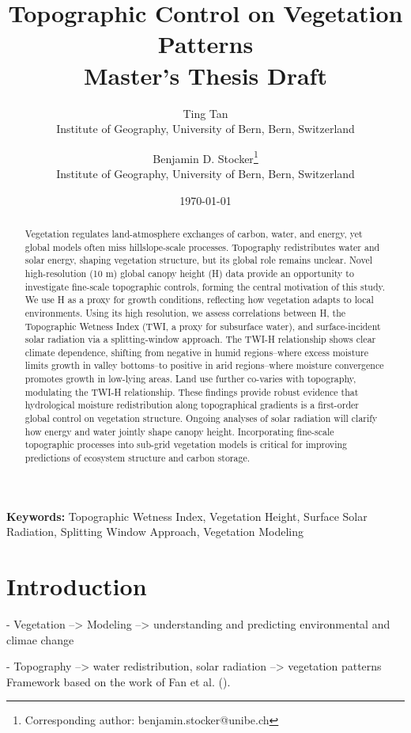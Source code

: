 \documentclass[12pt, a4paper]{article}
\title{Topographic Control on Vegetation Patterns \\ \Large Master's Thesis Draft}
\author{
    Ting Tan \\
    Institute of Geography, University of Bern, Bern, Switzerland
    \and
    Benjamin D. Stocker\thanks{Corresponding author: benjamin.stocker@unibe.ch} \\
    Institute of Geography, University of Bern, Bern, Switzerland
}
\date{\today}
\begin{document}
\maketitle

\begin{abstract}
Vegetation regulates land-atmosphere exchanges of carbon, water, and energy, yet global models often miss hillslope-scale processes. Topography redistributes water and solar energy, shaping vegetation structure, but its global role remains unclear. Novel high-resolution (10 m) global canopy height (H) data provide an opportunity to investigate fine-scale topographic controls, forming the central motivation of this study. We use H as a proxy for growth conditions, reflecting how vegetation adapts to local environments. Using its high resolution, we assess correlations between H, the Topographic Wetness Index (TWI, a proxy for subsurface water), and surface-incident solar radiation via a splitting-window approach. The TWI-H relationship shows clear climate dependence, shifting from negative in humid regions--where excess moisture limits growth in valley bottoms--to positive in arid regions--where moisture convergence promotes growth in low-lying areas. Land use further co-varies with topography, modulating the TWI-H relationship. These findings provide robust evidence that hydrological moisture redistribution along topographical gradients is a first-order global control on vegetation structure. Ongoing analyses of solar radiation will clarify how energy and water jointly shape canopy height. Incorporating fine-scale topographic processes into sub-grid vegetation models is critical for improving predictions of ecosystem structure and carbon storage.
\end{abstract}

\textbf{Keywords:} Topographic Wetness Index, Vegetation Height, Surface Solar Radiation, Splitting Window Approach, Vegetation Modeling

\tableofcontents
\newpage

\section{Introduction}

- Vegetation -->  Modeling --> understanding and predicting environmental and climae change

- Topography --> water redistribution, solar radiation --> vegetation patterns
Framework based on the work of Fan et al. (\citeyear{fan2019a}).
\end{document}
